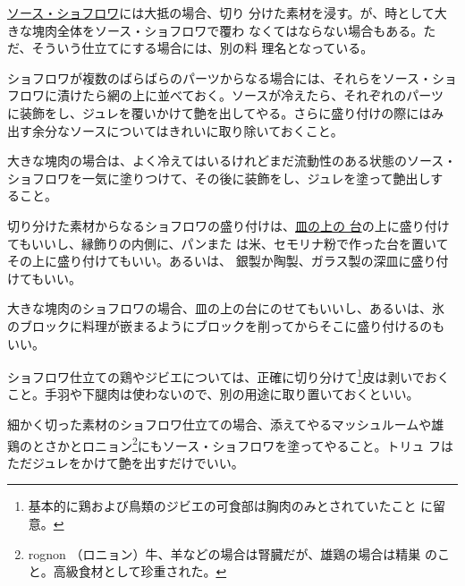 

\protect\hyperlink{sauce-chaud-froid-ordinaire}{ソース・ショフロワ}には大抵の場合、切り
分けた素材を浸す。が、時として大きな塊肉全体をソース・ショフロワで覆わ
なくてはならない場合もある。ただ、そういう仕立てにする場合には、別の料
理名となっている。

ショフロワが複数のばらばらのパーツからなる場合には、それらをソース・ショ
フロワに漬けたら網の上に並べておく。ソースが冷えたら、それぞれのパーツ
に装飾をし、ジュレを覆いかけて艶を出してやる。さらに盛り付けの際にはみ
出す余分なソースについてはきれいに取り除いておくこと。

大きな塊肉の場合は、よく冷えてはいるけれどまだ流動性のある状態のソース・
ショフロワを一気に塗りつけて、その後に装飾をし、ジュレを塗って艶出しす
ること。

切り分けた素材からなるショフロワの盛り付けは、\protect\hyperlink{fonds-de-plats}{皿の上の
台}の上に盛り付けてもいいし、縁飾りの内側に、パンまた
は米、セモリナ粉で作った台を置いてその上に盛り付けてもいい。あるいは、
銀製か陶製、ガラス製の深皿に盛り付けてもいい。

大きな塊肉のショフロワの場合、皿の上の台にのせてもいいし、あるいは、氷
のブロックに料理が嵌まるようにブロックを削ってからそこに盛り付けるのも
いい。

ショフロワ仕立ての鶏やジビエについては、正確に切り分けて\footnote{基本的に鶏および鳥類のジビエの可食部は胸肉のみとされていたこと
  に留意。}皮は剥いでおく
こと。手羽や下腿肉は使わないので、別の用途に取り置いておくといい。

細かく切った素材のショフロワ仕立ての場合、添えてやるマッシュルームや雄
鶏のとさかとロニョン\footnote{rognon
  （ロニョン）牛、羊などの場合は腎臓だが、雄鶏の場合は精巣
  のこと。高級食材として珍重された。}にもソース・ショフロワを塗ってやること。トリュ
フはただジュレをかけて艶を出すだけでいい。
